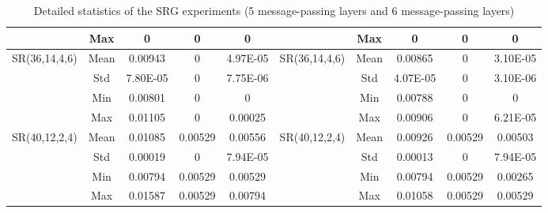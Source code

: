 \documentclass[letterpaper]{article} \usepackage{aaai24}  \usepackage{times}  \usepackage{helvet}  \usepackage{courier}  \usepackage[hyphens]{url}  \usepackage{graphicx} \urlstyle{rm} \def\UrlFont{\rm}  \usepackage{natbib}  \usepackage{caption} \frenchspacing  \setlength{\pdfpagewidth}{8.5in} \setlength{\pdfpageheight}{11in} \usepackage{algorithm}
\begin{document}
\begin{table*}[t]
{\begin{tabular}{@{}ccccc|ccccc@{}}
\multicolumn{1}{c|}{}                               & \multicolumn{1}{c|}{Max}  & 0         & 0         & 0        & \multicolumn{1}{c|}{}                               & \multicolumn{1}{c|}{Max}  & 0         & 0         & 0        \\ \midrule
\multicolumn{1}{c|}{\multirow{4}{*}{SR(36,14,4,6)}} & \multicolumn{1}{c|}{Mean} & 0.00943   & 0         & 4.97E-05 & \multicolumn{1}{c|}{\multirow{4}{*}{SR(36,14,4,6)}} & \multicolumn{1}{c|}{Mean} & 0.00865   & 0         & 3.10E-05 \\
\multicolumn{1}{c|}{}                               & \multicolumn{1}{c|}{Std}  & 7.80E-05  & 0         & 7.75E-06 & \multicolumn{1}{c|}{}                               & \multicolumn{1}{c|}{Std}  & 4.07E-05  & 0         & 3.10E-06 \\
\multicolumn{1}{c|}{}                               & \multicolumn{1}{c|}{Min}  & 0.00801   & 0         & 0        & \multicolumn{1}{c|}{}                               & \multicolumn{1}{c|}{Min}  & 0.00788   & 0         & 0        \\
\multicolumn{1}{c|}{}                               & \multicolumn{1}{c|}{Max}  & 0.01105   & 0         & 0.00025  & \multicolumn{1}{c|}{}                               & \multicolumn{1}{c|}{Max}  & 0.00906   & 0         & 6.21E-05 \\ \midrule
\multicolumn{1}{c|}{\multirow{4}{*}{SR(40,12,2,4)}} & \multicolumn{1}{c|}{Mean} & 0.01085   & 0.00529   & 0.00556  & \multicolumn{1}{c|}{\multirow{4}{*}{SR(40,12,2,4)}} & \multicolumn{1}{c|}{Mean} & 0.00926   & 0.00529   & 0.00503  \\
\multicolumn{1}{c|}{}                               & \multicolumn{1}{c|}{Std}  & 0.00019   & 0         & 7.94E-05 & \multicolumn{1}{c|}{}                               & \multicolumn{1}{c|}{Std}  & 0.00013   & 0         & 7.94E-05 \\
\multicolumn{1}{c|}{}                               & \multicolumn{1}{c|}{Min}  & 0.00794   & 0.00529   & 0.00529  & \multicolumn{1}{c|}{}                               & \multicolumn{1}{c|}{Min}  & 0.00794   & 0.00529   & 0.00265  \\
\multicolumn{1}{c|}{}                               & \multicolumn{1}{c|}{Max}  & 0.01587   & 0.00529   & 0.00794  & \multicolumn{1}{c|}{}                               & \multicolumn{1}{c|}{Max}  & 0.01058   & 0.00529   & 0.00529  \\ \bottomrule
\end{tabular}}
\caption{Detailed statistics of the SRG experiments (5 message-passing layers and 6 message-passing layers)}
\label{tab:details-sr-b}
\end{table*}
\end{document}
